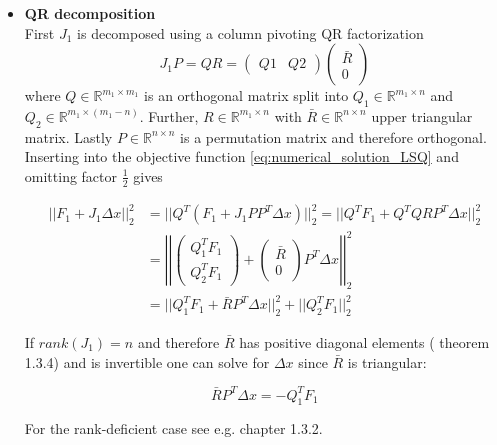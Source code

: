 \documentclass{scrartcl}[12pt, halfparskip]
\numberwithin{equation}{section}
\numberwithin{figure}{section}
\numberwithin{table}{section}
\begin{document}
\begin{itemize}
	\item \textbf{QR decomposition} \\
	First $J_1$ is decomposed using a column pivoting QR factorization
	\begin{equation}
		J_1 P = Q R = 
		\begin{pmatrix}
			Q1 & Q2
		\end{pmatrix}
		\begin{pmatrix}
			\bar{R} \\
			0
		\end{pmatrix}
	\end{equation}
	where $Q \in \mathbb{R}^{m_1 \times m_1}$ is an orthogonal matrix split into $Q_1 \in \mathbb{R}^{m_1 \times n}$ and $Q_2 \in \mathbb{R}^{m_1 \times (m_1-n)}$. Further, $R \in \mathbb{R}^{m_1 \times n}$ with $\bar{R} \in \mathbb{R}^{n \times n}$ upper triangular matrix. Lastly $P \in \mathbb{R}^{n \times n}$ is a permutation matrix and therefore orthogonal. Inserting into the objective function \cref{eq:numerical_solution_LSQ} and omitting factor $\frac{1}{2}$ gives
	
	\begin{align}
		|| F_1 + J_1 \Delta x ||_2^2 & = || Q^T (F_1 + J_1 P P^T \Delta x) ||_2^2 = || Q^T F_1 + Q^T Q R P^T \Delta x ||_2^2 \\
		& = \left| \left| \begin{pmatrix}
		Q_1^T F_1 \\
		Q_2^T F_1
		\end{pmatrix} + 
		\begin{pmatrix}
		\bar{R} \\
		0
		\end{pmatrix}
		P^T \Delta x \right| \right|_2^2 \nonumber \\
		& = || Q_1^T F_1 + \bar{R} P^T \Delta x ||_2^2 + ||Q_2^T F_1 ||_2^2 \nonumber
	\end{align}
	
	If $rank(J_1)=n$ and therefore $\bar{R}$ has positive diagonal elements (\cite{numerical_methods_lsq_Bjorck} theorem 1.3.4) and is invertible  one can solve for $\Delta x$ since $\bar{R}$ is triangular:
	
	\begin{equation}
		\bar{R} P^T \Delta x = -Q_1^T F_1
	\end{equation}
	
	For the rank-deficient case see e.g. \cite{numerical_methods_lsq_Bjorck} chapter 1.3.2.
		

\end{itemize}
\end{document}
